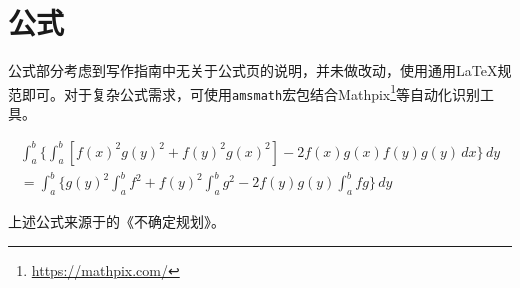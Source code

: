 \section{公式}
\label{sec:equation}

公式部分考虑到写作指南中无关于公式页的说明，并未做改动，使用通用\LaTeX{}规范即可。对于复杂公式需求，可使用\verb|amsmath|宏包结合Mathpix\footnote{\url{https://mathpix.com/}}等自动化识别工具。

\begin{multline*}
\int_a^b\biggl\{\int_a^b[f(x)^2g(y)^2+f(y)^2g(x)^2]
 -2f(x)g(x)f(y)g(y)\,dx\biggr\}\,dy \\
 =\int_a^b\biggl\{g(y)^2\int_a^bf^2+f(y)^2
    \int_a^b g^2-2f(y)g(y)\int_a^b fg\biggr\}\,dy
\end{multline*}

上述公式来源于\citeauthor{liu2003uncertain}的《不确定规划》\citet{liu2003uncertain}。
